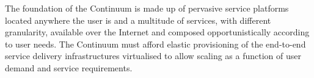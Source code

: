 
The foundation of the Continuum is made up of pervasive service platforms located anywhere the user is and a multitude of services, with different granularity, available over the Internet and composed opportunistically according to user needs.
The Continuum must afford elastic provisioning of the end-to-end service delivery infrastructures virtualised to allow scaling as a function of user demand and service requirements. 



